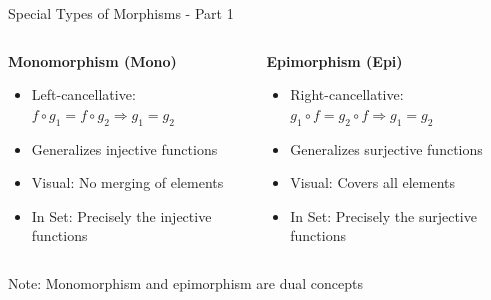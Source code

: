 \documentclass{beamer}
\begin{document}
\begin{frame}{Special Types of Morphisms - Part 1}
    \begin{columns}
        \begin{column}{0.5\textwidth}
            \textbf{Monomorphism (Mono)}
            \begin{itemize}
                \item Left-cancellative: $f \circ g_1 = f \circ g_2 \Rightarrow g_1 = g_2$
                \item Generalizes injective functions
                \item Visual: No merging of elements
                \item In Set: Precisely the injective functions
            \end{itemize}
        \end{column}
        \begin{column}{0.5\textwidth}
            \textbf{Epimorphism (Epi)}
            \begin{itemize}
                \item Right-cancellative: $g_1 \circ f = g_2 \circ f \Rightarrow g_1 = g_2$
                \item Generalizes surjective functions
                \item Visual: Covers all elements
                \item In Set: Precisely the surjective functions
            \end{itemize}
        \end{column}
    \end{columns}
    
    \vspace{0.5cm}
    Note: Monomorphism and epimorphism are dual concepts
\end{frame}
\end{document}
